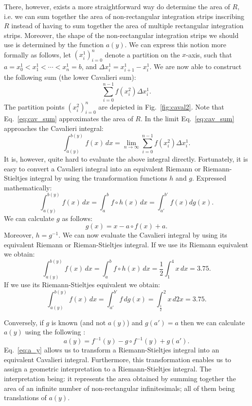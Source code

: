 \documentclass{article}
\theoremstyle{theorem}
\theoremstyle{definition}
\begin{document}
\noindent
There, however, exists a more straightforward way do determine the area of $R$, i.e. we can sum together the area of non-rectangular integration strips inscribing $R$ instead of
having to sum together the area of multiple rectangular integration strips. Moreover, the shape of the non-rectangular integration strips we should use is determined by the function $a(y)$. We can express this notion more formally as 
follows, let $(x_i^1)_{i=0}^{n}$ denote a partition on the $x$-axis, such that $a = x_0^1 < x_1^1 < \cdots < x_n^1 = b$, and $\Delta x_i^1 = x_{i+1}^1 - x_i^1$.
We are now able to construct the following sum (the lower Cavalieri sum):
\begin{equation}
\label{eq:cav_sum}
\sum_{i=0}^{n-1} f(x_i^2)\Delta x_i^1.
\end{equation}
The partition points $(x_i^2)_{i=0}^{n}$ are depicted in Fig.~\ref{fig:caval2}. Note that Eq.~\eqref{eq:cav_sum} approximates the area of $R$. In the limit Eq.~\eqref{eq:cav_sum} approaches 
the Cavalieri integral:
\begin{equation}
\label{eq:caval1}
\int_{a(y)}^{b(y)}f(x)\, dx = \lim_{n\to \infty}\sum_{i=0}^{n-1} f(x_i^2)\Delta x_i^1.
\end{equation}
It is, however, quite hard to evaluate the above integral directly. Fortunately, it is easy to convert a Cavalieri integral into an equivalent Riemann or Riemann-Stieltjes 
integral by using the transformation functions $h$ and $g$. Expressed mathematically:
\begin{equation}
\label{eq:main_cav}
\int_{a(y)}^{b(y)}f(x)\,dx =\int_a^b f \circ h (x)\, dx = \int_{a'}^{b'} f(x) dg(x).
\end{equation}
We can calculate $g$ as follows:
\begin{equation}
g(x) = x - a\circ f(x) + a.
\end{equation}
Moreover, $h=g^{-1}$. We can now evaluate the Cavalieri integral by using its equivalent Riemann or Rieman-Stieltjes integral.
If we use its Riemann equivalent we obtain:
\begin{equation}
\int_{a(y)}^{b(y)}f(x)\, dx = \int_a^b f \circ h (x)\, dx = \dfrac{1}{2}\int_1^4x\, dx = 3.75.  
\end{equation}
If we use its Riemann-Stieltjes equivalent we obtain:
\begin{equation}
\int_{a(y)}^{b(y)}f(x)\, dx = \int_{a'}^{b'} f \, dg(x) = \int_{\frac{1}{2}}^2x\, d2x = 3.75.  
\end{equation}

\noindent
Conversely, if $g$ is known (and not $a(y)$) and $g(a') = a$ then we can calculate $a(y)$ using the following \cite{grobler19}:
\begin{equation}
\label{eq:a_y}
a(y) = f^{-1}(y) - g\circ f^{-1}(y) + g(a'). 
\end{equation}
Eq.~\eqref{eq:a_y} allows us to transform a Riemann-Stieltjes integral into an equivalent Cavalieri integral. 
Furthermore, this transformation enables us to assign a geometric interpretation to a Riemann-Stieltjes integral. The interpretation being:
it represents the area obtained by summing together the area of an infinite number of non-rectangular infinitesimals; all of them being translations of $a(y)$.
\end{document}
